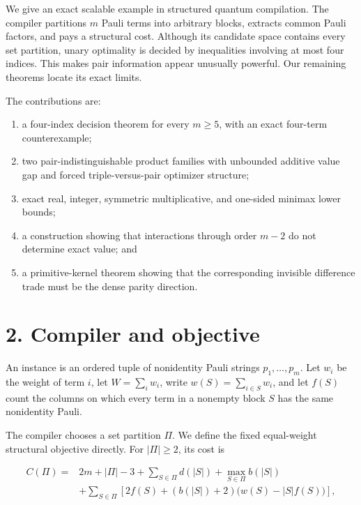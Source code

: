 \documentclass[
  11pt,
]{article}
\providecommand{\tightlist}{%
  \setlength{\itemsep}{0pt}\setlength{\parskip}{0pt}}
\begin{document}
We give an exact scalable example in structured quantum compilation. The
compiler partitions \(m\) Pauli terms into arbitrary blocks, extracts
common Pauli factors, and pays a structural cost. Although its candidate
space contains every set partition, unary optimality is decided by
inequalities involving at most four indices. This makes pair information
appear unusually powerful. Our remaining theorems locate its exact
limits.

The contributions are:

\begin{enumerate}
\def\labelenumi{\arabic{enumi}.}
\tightlist
\item
  a four-index decision theorem for every \(m\ge5\), with an exact
  four-term counterexample;
\item
  two pair-indistinguishable product families with unbounded additive
  value gap and forced triple-versus-pair optimizer structure;
\item
  exact real, integer, symmetric multiplicative, and one-sided minimax
  lower bounds;
\item
  a construction showing that interactions through order \(m-2\) do not
  determine exact value; and
\item
  a primitive-kernel theorem showing that the corresponding invisible
  difference trade must be the dense parity direction.
\end{enumerate}

\hypertarget{compiler-and-objective}{%
\section{2. Compiler and objective}\label{compiler-and-objective}}

An instance is an ordered tuple of nonidentity Pauli strings
\(p_1, \ldots, p_m\). Let \(w_i\) be the weight of term \(i\), let
\(W=\sum_iw_i\), write \(w(S)=\sum_{i\in S}w_i\), and let \(f(S)\) count
the columns on which every term in a nonempty block \(S\) has the same
nonidentity Pauli.

The compiler chooses a set partition \(\Pi\). We define the fixed
equal-weight structural objective directly. For \(|\Pi|\ge2\), its cost
is

\[
\begin{aligned}
C(\Pi)={}&2m+|\Pi|-3+\sum_{S\in\Pi}d(|S|)
+\max_{S\in\Pi}b(|S|)\\
&+\sum_{S\in\Pi}\left[2f(S)+(b(|S|)+2)
\bigl(w(S)-|S|f(S)\bigr)\right],
\end{aligned}
\]
\end{document}
